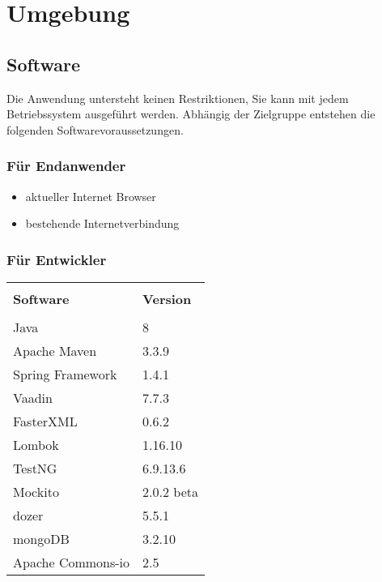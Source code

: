  
\section{Umgebung}
 
\subsection{Software}

Die Anwendung untersteht keinen Restriktionen, Sie kann mit jedem Betriebssystem ausgeführt werden.
Abhängig der Zielgruppe entstehen die folgenden Softwarevoraussetzungen.

\subsubsection {Für Endanwender}

\begin{itemize}
\item aktueller Internet Browser 
\item bestehende Internetverbindung
\end{itemize}

\subsubsection	{Für Entwickler}

\begin{table}[H]
\begin{center}
\begin{tabular}{|ll|}
\hline \cellcolor{blue!25} & \cellcolor{blue!25}\\[-0.4cm]
\cellcolor{blue!25} \textbf{Software} &  \cellcolor{blue!25} \textbf{Version} \\ 
\hline& \\[-0.4cm]
Java              & 8                \\[0.1cm]
Apache Maven      & 3.3.9            \\[0.1cm]
Spring Framework  & 1.4.1            \\[0.1cm] 
Vaadin            & 7.7.3            \\[0.1cm]
FasterXML         & 0.6.2            \\[0.1cm]
Lombok            & 1.16.10          \\[0.1cm]
TestNG            & 6.9.13.6         \\[0.1cm]
Mockito           & 2.0.2 beta       \\[0.1cm]
dozer             & 5.5.1            \\[0.1cm]
mongoDB           & 3.2.10            \\[0.1cm]
Apache Commons-io & 2.5 \\
\hline             
\end{tabular}
\end{center}
\end{table}
 
